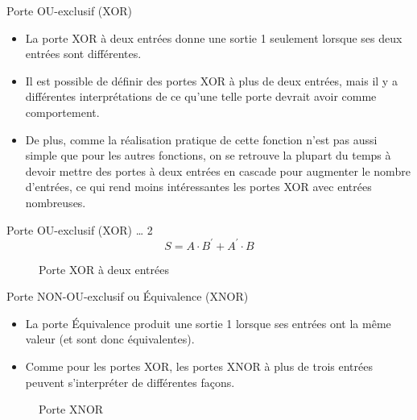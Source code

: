 \documentclass[presentation]{beamer}
\begin{document}
\begin{frame}[label={sec:orgd315d45}]{Porte OU-exclusif (XOR)}
\begin{itemize}
\item La porte XOR à deux entrées donne une sortie 1 seulement lorsque ses deux entrées sont différentes.

\item Il est possible de définir des portes XOR à plus de deux entrées, mais il y a différentes interprétations de ce qu'une telle porte devrait avoir comme comportement.

\item De plus, comme la réalisation pratique de cette fonction n'est pas aussi simple que pour les autres fonctions, on se retrouve la plupart du temps à devoir mettre des portes à deux entrées en cascade pour augmenter le nombre d'entrées, ce qui rend moins intéressantes les portes XOR avec entrées nombreuses.
\end{itemize}
\end{frame}

\begin{frame}[label={sec:orga7e3cd6}]{Porte OU-exclusif (XOR) \ldots{} 2}
$$ S= A \cdot B^\prime + A^\prime \cdot B $$  

\begin{figure}[htbp]
\centering

\caption{\label{fig:org2c56235}Porte XOR à deux entrées}
\end{figure}
\end{frame}

\begin{frame}[label={sec:org9235ca3}]{Porte NON-OU-exclusif ou Équivalence (XNOR)}
\begin{itemize}
\item La porte \alert{Équivalence} produit une sortie 1 lorsque ses entrées ont la même valeur (et sont donc équivalentes).

\item Comme pour les portes XOR, les portes XNOR à plus de trois entrées peuvent s'interpréter de différentes façons.
\end{itemize}

\begin{figure}[htbp]
\centering

\caption{\label{fig:org423c81c}Porte XNOR}
\end{figure}
\end{frame}
\end{document}
